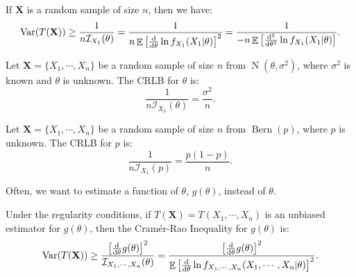 \documentclass{huhtakm-template-book-v2}
\DeclareMathOperator{\E}{\mathbb{E}}
\DeclareMathOperator{\Var}{Var}
\DeclareMathOperator{\Bern}{Bern}
\DeclareMathOperator{\N}{N}
\begin{document}
    \begin{rem}
        If $\mathbf{X}$ is a random sample of size $n$, then we have:
        \begin{equation*}
            \Var(T(\mathbf{X}))\geq\frac{1}{n\mathcal{I}_{X_{1}}(\theta)}=\frac{1}{n\E\left[\odv*{\ln{f_{X_{1}}(X_{1}|\theta)}}{\theta}\right]^{2}}=\frac{1}{-n\E\left[\odv*[order={2}]{\ln{f_{X_{1}}(X_{1}|\theta)}}{\theta}\right]}.
        \end{equation*}
    \end{rem}
    \begin{eg}
        Let $\mathbf{X}=\{X_{1},\cdots,X_{n}\}$ be a random sample of size $n$ from $\N(\theta,\sigma^{2})$, where $\sigma^{2}$ is known and $\theta$ is unknown. The CRLB for $\theta$ is:
        \begin{equation*}
            \frac{1}{n\mathcal{I}_{X_{1}}(\theta)}=\frac{\sigma^{2}}{n}.
        \end{equation*}
    \end{eg}
    \begin{eg}
        Let $\mathbf{X}=\{X_{1},\cdots,X_{n}\}$ be a random sample of size $n$ from $\Bern(p)$, where $p$ is unknown. The CRLB for $p$ is:
        \begin{equation*}
            \frac{1}{n\mathcal{I}_{X_{1}}(p)}=\frac{p(1-p)}{n}.
        \end{equation*}
    \end{eg}
    Often, we want to estimate a function of $\theta$, $g(\theta)$, instead of $\theta$.
    \begin{thm}
        Under the regularity conditions, if $T(\mathbf{X})=T(X_{1},\cdots,X_{n})$ is an unbiased estimator for $g(\theta)$, then the Cram\'er-Rao Inequality for $g(\theta)$ is:
        \begin{equation*}
            \Var(T(\mathbf{X}))\geq\frac{\left[\odv*{g(\theta)}{\theta}\right]^{2}}{\mathcal{I}_{X_{1},\cdots,X_{n}}(\theta)}=\frac{\left[\odv*{g(\theta)}{\theta}\right]^{2}}{\E\left[\odv*{\ln{f_{X_{1},\cdots,X_{n}}(X_{1},\cdots,X_{n}|\theta)}}{\theta}\right]^{2}}.
        \end{equation*}
    \end{thm}
\end{document}
